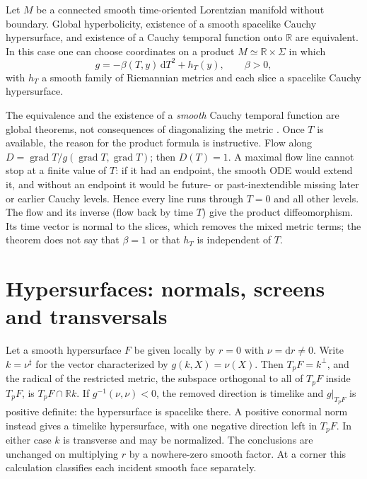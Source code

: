\begin{theorem}\label{f:cauchy-splitting}
Let $M$ be a connected smooth time-oriented Lorentzian manifold without boundary. Global hyperbolicity, existence of a smooth spacelike Cauchy hypersurface, and existence of a Cauchy temporal function onto $\mathbb R$ are equivalent. In this case one can choose coordinates on a product $M\simeq\mathbb R\times\Sigma$ in which
\[
 g=-\beta(T,y)\,\mathrm dT^2+h_T(y),\qquad \beta>0 ,
\]
with $h_T$ a smooth family of Riemannian metrics and each slice a spacelike Cauchy hypersurface.
\end{theorem}

The equivalence and the existence of a \emph{smooth} Cauchy temporal function are global theorems, not consequences of diagonalizing the metric \cite{BGP,BS}. Once $T$ is available, the reason for the product formula is instructive. Flow along $D=\operatorname{grad}T/g(\operatorname{grad}T,\operatorname{grad}T)$; then $D(T)=1$. A maximal flow line cannot stop at a finite value of $T$: if it had an endpoint, the smooth ODE would extend it, and without an endpoint it would be future- or past-inextendible missing later or earlier Cauchy levels. Hence every line runs through $T=0$ and all other levels. The flow and its inverse (flow back by time $T$) give the product diffeomorphism. Its time vector is normal to the slices, which removes the mixed metric terms; the theorem does not say that $\beta=1$ or that $h_T$ is independent of $T$.

\section{Hypersurfaces: normals, screens and transversals}

Let a smooth hypersurface $F$ be given locally by $r=0$ with $\nu=\mathrm dr\ne0$. Write $k=\nu^\sharp$ for the vector characterized by $g(k,X)=\nu(X)$. Then $T_pF=k^\perp$, and the radical of the restricted metric, the subspace orthogonal to all of $T_pF$ inside $T_pF$, is $T_pF\cap\mathbb R k$. If $g^{-1}(\nu,\nu)<0$, the removed direction is timelike and $g|_{T_pF}$ is positive definite: the hypersurface is spacelike there. A positive conormal norm instead gives a timelike hypersurface, with one negative direction left in $T_pF$. In either case $k$ is transverse and may be normalized. The conclusions are unchanged on multiplying $r$ by a nowhere-zero smooth factor. At a corner this calculation classifies each incident smooth face separately.

